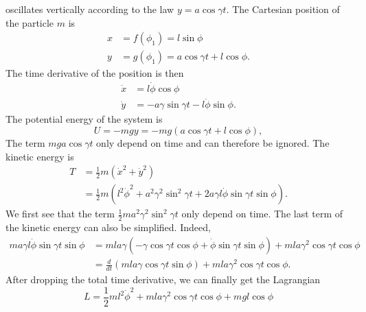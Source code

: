 \begin{subproblem}
{
 oscillates vertically according to the law $y=a\cos{\gamma t}$.
}
{
The Cartesian position of the particle $m$ is
\begin{align*}
    x &= f(\phi_1) = l \sin{\phi} \\
    y &= g(\phi_1) = a \cos{\gamma t} + l \cos{\phi} .
\end{align*}
The time derivative of the position is then
\begin{align*}
    \Dot{x} &= l \Dot{\phi} \cos{\phi} \\
    \Dot{y} &= -a \gamma \sin{\gamma t} - l \Dot{\phi} \sin{\phi} .
\end{align*}
The potential energy of the system is 
\begin{equation*}
    U = -mgy = -mg \left( a \cos{\gamma t} + l \cos{\phi} \right),
\end{equation*}
The term $mga \cos{\gamma t}$ only depend on time and can therefore be ignored. The kinetic energy is
\begin{align*}
    T &= \frac{1}{2} m (\Dot{x}^2 + \Dot{y}^2)\\
    &= \frac{1}{2} m \left(l^2\Dot{\phi}^2 + a^2\gamma^2\sin^2{\gamma t} + 2a\gamma l \Dot{\phi}\sin{\gamma t}\sin{\phi}\right).
\end{align*}
We first see that the term $\frac{1}{2} m a^2\gamma^2\sin^2{\gamma t}$ only depend on time. The last term of the kinetic energy can also be simplified. Indeed, 
\begin{align*}
       m a\gamma l \Dot{\phi}\sin{\gamma t}\sin{\phi} &= 
      m l a \gamma (-\gamma \cos{\gamma t} \cos{\phi} + \Dot{\phi} \sin{\gamma t}\sin{\phi}) + m l a \gamma^2 \cos{\gamma t}\cos{\phi} \\
      &= \frac{d}{dt} \left( mla\gamma\cos{\gamma t}\sin{\phi} \right) + m l a \gamma^2 \cos{\gamma t}\cos{\phi}.
\end{align*}
After dropping the total time derivative, we can finally get the Lagrangian
}
{
\begin{equation*}
    L = \frac{1}{2} m l^2\Dot{\phi}^2 + m l a \gamma^2 \cos{\gamma t}\cos{\phi}  + mgl\cos{\phi}
\end{equation*}
}
\end{subproblem}


